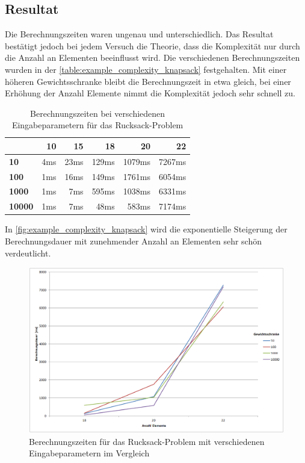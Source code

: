 \subsection{Resultat}
Die Berechnungszeiten waren ungenau und unterschiedlich. Das Resultat bestätigt jedoch bei jedem Versuch die Theorie, dass die Komplexität nur durch die Anzahl an Elementen 
beeinflusst wird. Die verschiedenen Berechnungszeiten wurden in der \autoref{table:example_complexity_knapsack} festgehalten. Mit einer höheren Gewichtsschranke bleibt die 
Berechnungszeit in etwa gleich, bei einer Erhöhung der Anzahl Elemente nimmt die Komplexität jedoch sehr schnell zu.

\begin{table}[ht]
\centering
  \begin{tabular}{ l | r | r | r | r | r }
	\hline
	\rowcolor{gray}
	\backslashbox{Gewichtsschranke:}{Anzahl an Elemente:}	& \textbf{10}	& \textbf{15} 	& \textbf{18}	& \textbf{20}	& \textbf{22}\\ \hline
	\textbf{10}							& 4ms			& 23ms		& 129ms		& 1079ms		& 7267ms 	\\ \hline
	\textbf{100}							& 1ms			& 16ms		& 149ms		& 1761ms		& 6054ms	\\ \hline
	\textbf{1000}						& 1ms			& 7ms			& 595ms		& 1038ms		& 6331ms	\\ \hline
	\textbf{10000}						& 1ms			& 7ms			& 48ms		& 583ms		& 7174ms	\\ \hline
  \end{tabular}
   \caption[Berechnungszeiten bei verschiedenen Eingabeparametern für das Rucksack-Problem]{Berechnungszeiten bei verschiedenen Eingabeparametern für das Rucksack-Problem}
   \label{table:example_complexity_knapsack}
\end{table}

In \autoref{fig:example_complexity_knapsack} wird die exponentielle Steigerung der Berechnungsdauer mit zunehmender Anzahl an Elementen sehr schön verdeutlicht.

\begin{figure}[h]
\centering
\includegraphics[scale=0.45]{images/excel/knapsack_complexity_example.png}
\caption[Berechnungszeiten für das Rucksack-Problem mit verschiedenen Eingabeparametern im Vergleich]{Berechnungszeiten für das Rucksack-Problem mit verschiedenen Eingabeparametern 
im Vergleich \selfmade{}}
\label{fig:example_complexity_knapsack}
\end{figure}
